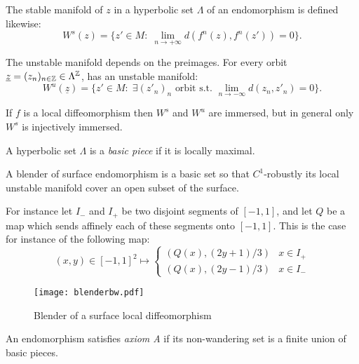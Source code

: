 \documentclass[11pt,openany,leqno]{article}
\begin{document}
The stable manifold of $z$ in a hyperbolic set $\Lambda$ of an endomorphism is defined likewise: 
\[W^s(z)= \{z'\in M:\; \lim_{ n\to+\infty} d(f^n(z),f^n(z'))= 0\}.\] 

The unstable manifold depends on the preimages.  For every orbit $\underline z= (z_n)_{n\in \mathbb Z} \in \Lambda^\mathbb Z$, has an unstable manifold:  
\[W^u(\underline z)= \{z'\in M:\; \exists (z'_n)_n \text{ orbit s.t. } \lim_{ n\to-\infty} d(z_n,z'_n)= 0\}.\]

If $f$ is a local diffeomorphism then $W^s$ and $W^u$ are immersed, but in general only $W^s$ is injectively immersed. 



\begin{defi}A hyperbolic set $\Lambda$ is a \emph{basic piece} if it is locally maximal.
\end{defi}

\begin{exam}[Blender]\label{blender}
A blender of surface endomorphism is a basic set so that $C^1$-robustly its local unstable manifold cover an open subset of the surface. 

For instance let $I_-$ and $I_+$ be two disjoint segments of $[-1,1]$, and let $Q$ be a map which sends affinely each of these segments onto $[-1,1]$. 
 This is the case for instance of the following map:
\[(x,y)\in [-1,1]^2\mapsto \left\{\begin{array}{cl}
(Q(x), (2 y+1)/3)& x\in I_+\\
 (Q(x), (2 y-1)/3)& x\in I_-\end{array}\right. \]

\begin{figure}[h!]
	\centering
		\texttt{[image: blenderbw.pdf]}
	\caption{Blender of a surface local diffeomorphism}
\end{figure}

\end{exam}    
\begin{defi}An endomorphism satisfies  \emph{axiom A} if its non-wandering set is a finite  union of basic pieces.\end{defi}

\end{document}
